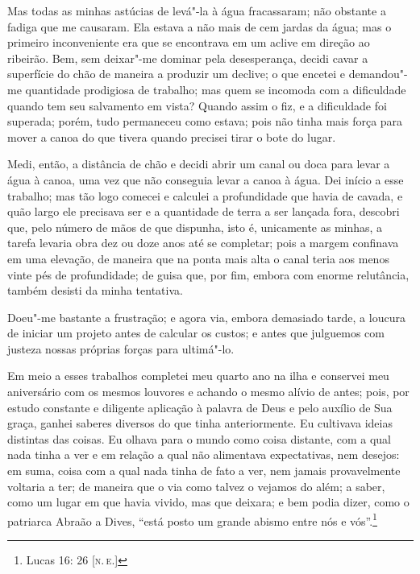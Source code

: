 Mas todas as minhas astúcias de levá"-la à água fracassaram; não obstante
a fadiga que me causaram. Ela estava a não mais de cem jardas da água;
mas o primeiro inconveniente era que se encontrava em um aclive em
direção ao ribeirão. Bem, sem deixar"-me dominar pela desesperança,
decidi cavar a superfície do chão de maneira a produzir um declive; o
que encetei e demandou"-me quantidade prodigiosa de trabalho; mas quem se
incomoda com a dificuldade quando tem seu salvamento em vista? Quando
assim o fiz, e a dificuldade foi superada; porém, tudo permaneceu como
estava; pois não tinha mais força para mover a canoa do que tivera
quando precisei tirar o bote do lugar.

Medi, então, a distância de chão e decidi abrir um canal ou doca para
levar a água à canoa, uma vez que não conseguia levar a canoa à água.
Dei início a esse trabalho; mas tão logo comecei e calculei a
profundidade que havia de cavada, e quão largo ele precisava ser e a
quantidade de terra a ser lançada fora, descobri que, pelo número de
mãos de que dispunha, isto é, unicamente as minhas, a tarefa levaria
obra dez ou doze anos até se completar; pois a margem confinava em uma
elevação, de maneira que na ponta mais alta o canal teria aos menos
vinte pés de profundidade; de guisa que, por fim, embora com enorme
relutância, também desisti da minha tentativa.

Doeu"-me bastante a frustração; e agora via, embora demasiado tarde, a
loucura de iniciar um projeto antes de calcular os custos; e antes que
julguemos com justeza nossas próprias forças para ultimá"-lo.

Em meio a esses trabalhos completei meu quarto ano na ilha e conservei
meu aniversário com os mesmos louvores e achando o mesmo alívio de
antes; pois, por estudo constante e diligente aplicação à palavra de
Deus e pelo auxílio de Sua graça, ganhei saberes diversos do que tinha
anteriormente. Eu cultivava ideias distintas das coisas. Eu olhava para
o mundo como coisa distante, com a qual nada tinha a ver e em relação a
qual não alimentava expectativas, nem desejos: em suma, coisa com a qual
nada tinha de fato a ver, nem jamais provavelmente voltaria a ter; de
maneira que o via como talvez o vejamos do além; a saber, como um lugar
em que havia vivido, mas que deixara; e bem podia dizer, como o
patriarca Abraão a Dives, ``está posto um grande abismo entre nós e
vós''.\footnote{Lucas 16: 26 {[}\textsc{n.\,e.}{]}}

